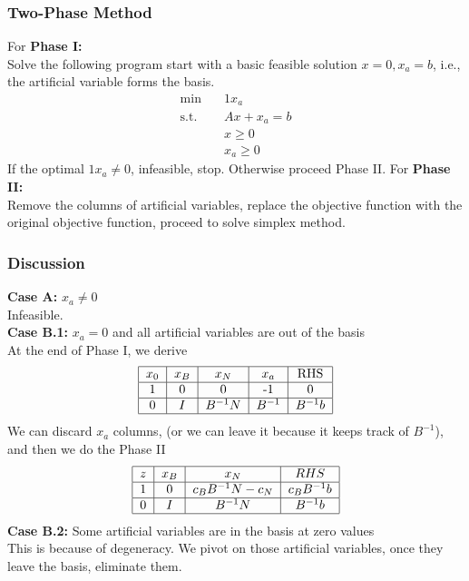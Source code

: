 				\subsubsection{Two-Phase Method}
					For \textbf{Phase I:}\\
						Solve the following program start with a basic feasible solution $x=0, x_a=b$, i.e., the artificial variable forms the basis.
						\begin{align}
							\min \quad & 1x_a \\
							\text{s.t.} \quad & Ax + x_a = b \\
											  & x \ge 0 \\
											  & x_a \ge 0 
						\end{align}
						If the optimal $1x_a \ne 0$, infeasible, stop. Otherwise proceed Phase II.
					For \textbf{Phase II:}\\
						Remove the columns of artificial variables, replace the objective function with the original objective function, proceed to solve simplex method.
				\subsubsection{Discussion}
					\textbf{Case A:} $x_a \ne 0$\\
						Infeasible.\\
					\textbf{Case B.1:} $x_a = 0$ and all artificial variables are out of the basis\\
					At the end of Phase I, we derive
					\begin{align}
						\begin{tabular} {|c|c|c|c|c|}
							\hline
							$x_0$ & $x_B$ & $x_N$ & $x_a$ & RHS \\
							\hline
							1 & 0 & 0 & -1 & 0\\
							\hline
							0 & $I$ & $B^{-1}N$ & $B^{-1}$ & $B^{-1}b$ \\
							\hline
						\end{tabular} 
					\end{align}
					We can discard $x_a$ columns, (or we can leave it because it keeps track of $B^{-1}$), and then we do the Phase II
					\begin{align}
						\begin{tabular} {|c|c|c|c|}
							\hline
							$z$ & $x_B$ & $x_N$ & $RHS$ \\
							\hline
							1 & 0 & $c_BB^{-1}N - c_N$ & $c_BB^{-1}b$ \\
							\hline
							0 & $I$ & $B^{-1}N$ & $B^{-1}b$ \\
							\hline
						\end{tabular} 		
					\end{align}
					\textbf{Case B.2:} Some artificial variables are in the basis at zero values\\
					This is because of degeneracy. We pivot on those artificial variables, once they leave the basis, eliminate them.
